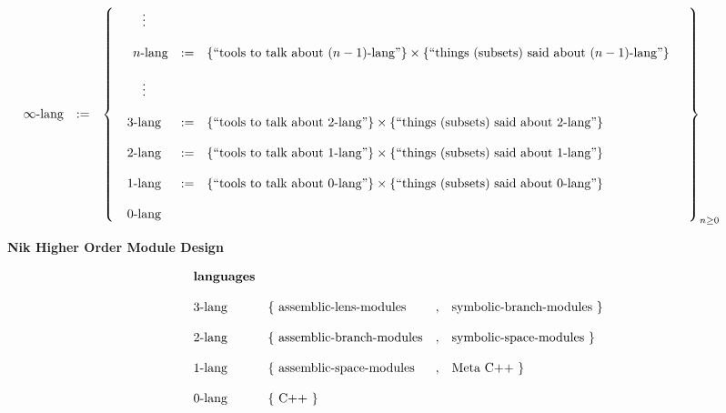 \documentclass[twoside]{article}
\begin{document}
$$ \hspace{-1.5cm}\begin{array}{rcl}
\infty\mbox{-lang} & := & \left\{\begin{array}{ccl}
 \vdots																	\\
																	\\
 \quad n\mbox{-lang}	& := & \{\mbox{``tools to talk about }(n-1)\mbox{-lang''}\}
				\times \{\mbox{``things (subsets) said about }(n-1)\mbox{-lang''}\} \quad				\\
																	\\
 \vdots																	\\
																	\\
 3\mbox{-lang}	& := & \{\mbox{``tools to talk about 2-lang''}\} \times \{\mbox{``things (subsets) said about 2-lang''}\}		\\
																	\\
 2\mbox{-lang}	& := & \{\mbox{``tools to talk about 1-lang''}\} \times \{\mbox{``things (subsets) said about 1-lang''}\}		\\
																	\\
 1\mbox{-lang}	& := & \{\mbox{``tools to talk about 0-lang''}\} \times \{\mbox{``things (subsets) said about 0-lang''}\}		\\
																	\\
 0\mbox{-lang}																\\
 \end{array}\right\}_{n\ge 0}
\end{array} $$

\vspace{0.5cm}

\begin{center}
\bf Nik Higher Order Module Design
\end{center}

$$ \begin{array}{llcl}
\mbox{\bf languages}															\\
																	\\
3\mbox{-lang}	& \{\ \mbox{assemblic-lens-modules}	& , & \mbox{symbolic-branch-modules}\ \}					\\
																	\\
2\mbox{-lang}	& \{\ \mbox{assemblic-branch-modules}	& , & \mbox{symbolic-space-modules}\ \}						\\
																	\\
1\mbox{-lang}	& \{\ \mbox{assemblic-space-modules}	& , & \mbox{Meta C++}\ \}							\\
																	\\
0\mbox{-lang}	& \{\ \mbox{C++}\ \}													\\
\end{array} $$
\end{document}
